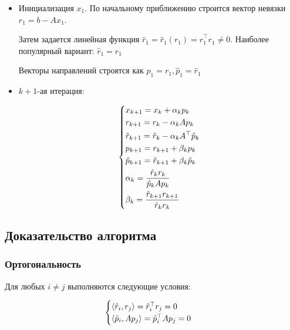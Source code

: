 \begin{itemize}
    \item Инициализация $x_1$. По начальному приближению строится вектор невязки $r_1 = b - Ax_1$.

    Затем задается линейная функция $\hat{r}_1 = \hat{r}_1(r_1) = \hat{r}_1^{\top} r_1 \neq 0$. Наиболее популярный вариант: $\hat{r}_1 = r_1$

    Векторы направлений строятся как $p_1 = r_1, \hat{p}_1 = \hat{r}_1$

    \item $k+1$-ая итерация:

    \begin{equation*}
        \begin{dcases*}
            x_{k+1} = x_k + \alpha_k p_k\\
            r_{k+1} = r_k - \alpha_k A p_k\\
            \hat{r}_{k+1} = \hat{r}_k - \alpha_k A^{\top} \hat{p}_k\\
            p_{k+1} = r_{k+1} + \beta_k p_k\\
            \hat{p}_{k+1} = \hat{r}_{k+1} + \beta_k \hat{p}_k\\
            \alpha_k = \frac{\hat{r}_k r_k}{ \hat{p}_k A p_k}\\
            \beta_k = \frac{\hat{r}_{k+1} r_{k+1}}{\hat{r}_k r_k}
        \end{dcases*}
    \end{equation*}
\end{itemize}

\subsection{Доказательство алгоритма}

\subsubsection*{Ортогональность}

\begin{claim}
    Для любых $i \neq j$ выполняются следующие условия:

    \[
        \begin{cases}
            \langle \hat{r}_i, r_j \rangle = \hat{r}_i^{\top} r_j = 0\\
            \langle \hat{p}_i, Ap_j \rangle = \hat{p}_i^{\top} A p_j = 0
        \end{cases}
    \]
\end{claim}

